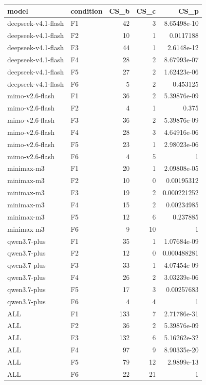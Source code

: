 \begin{tabular}{llrrr}
\toprule
model & condition & CS\_b & CS\_c & CS\_p \\
\midrule
deepseek-v4.1-flash & F1 & 42 & 3 & 8.65498e-10 \\
deepseek-v4.1-flash & F2 & 10 & 1 & 0.0117188 \\
deepseek-v4.1-flash & F3 & 44 & 1 & 2.6148e-12 \\
deepseek-v4.1-flash & F4 & 28 & 2 & 8.67993e-07 \\
deepseek-v4.1-flash & F5 & 27 & 2 & 1.62423e-06 \\
deepseek-v4.1-flash & F6 & 5 & 2 & 0.453125 \\
mimo-v2.6-flash & F1 & 36 & 2 & 5.39876e-09 \\
mimo-v2.6-flash & F2 & 4 & 1 & 0.375 \\
mimo-v2.6-flash & F3 & 36 & 2 & 5.39876e-09 \\
mimo-v2.6-flash & F4 & 28 & 3 & 4.64916e-06 \\
mimo-v2.6-flash & F5 & 23 & 1 & 2.98023e-06 \\
mimo-v2.6-flash & F6 & 4 & 5 & 1 \\
minimax-m3 & F1 & 20 & 1 & 2.09808e-05 \\
minimax-m3 & F2 & 10 & 0 & 0.00195312 \\
minimax-m3 & F3 & 19 & 2 & 0.000221252 \\
minimax-m3 & F4 & 15 & 2 & 0.00234985 \\
minimax-m3 & F5 & 12 & 6 & 0.237885 \\
minimax-m3 & F6 & 9 & 10 & 1 \\
qwen3.7-plus & F1 & 35 & 1 & 1.07684e-09 \\
qwen3.7-plus & F2 & 12 & 0 & 0.000488281 \\
qwen3.7-plus & F3 & 33 & 1 & 4.07454e-09 \\
qwen3.7-plus & F4 & 26 & 2 & 3.03239e-06 \\
qwen3.7-plus & F5 & 17 & 3 & 0.00257683 \\
qwen3.7-plus & F6 & 4 & 4 & 1 \\
ALL & F1 & 133 & 7 & 2.71786e-31 \\
ALL & F2 & 36 & 2 & 5.39876e-09 \\
ALL & F3 & 132 & 6 & 5.16262e-32 \\
ALL & F4 & 97 & 9 & 8.90335e-20 \\
ALL & F5 & 79 & 12 & 2.9899e-13 \\
ALL & F6 & 22 & 21 & 1 \\
\bottomrule
\end{tabular}

